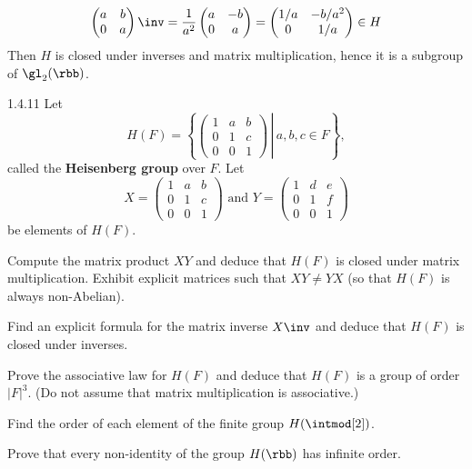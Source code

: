 \begin{solenum}
\[\begin{pmatrix}
            a & b \\
            0 & a
        \end{pmatrix}\inv = 
        \frac{1}{a^2}
        \begin{pmatrix}
            a & -b \\
            0 & a 
        \end{pmatrix} = 
        \begin{pmatrix}
            1/a & -b/a^2 \\
            0 & 1/a
        \end{pmatrix} \in H
    \]
    Then $H$ is closed under inverses and matrix multiplication, hence it is a subgroup of $\gl_2(\rbb)$.
\end{solenum}

\begin{exercise}{1.4.11}
    Let
    \[
        H(F) = \left\{\left.
        \begin{pmatrix}
            1 & a & b \\
            0 & 1 & c \\
            0 & 0 & 1
        \end{pmatrix}\,\right|\, a, b, c \in F\right\},
    \]
    called the \textbf{Heisenberg group} over $F$.
	Let
    \[
        X = 
        \begin{pmatrix}
            1 & a & b \\
            0 & 1 & c \\
            0 & 0 & 1
        \end{pmatrix} \text{ and }Y = 
        \begin{pmatrix}
            1 & d & e \\
            0 & 1 & f \\
            0 & 0 & 1
        \end{pmatrix}
    \]
    be elements of $H(F)$.
    \begin{subexercises}
        \item Compute the matrix product $XY$ and deduce that $H(F)$ is closed under matrix multiplication.
	    Exhibit explicit matrices such that $XY \neq YX$ (so that $H(F)$ is always non-Abelian).
        \item Find an explicit formula for the matrix inverse $X\inv$ and deduce that $H(F)$ is closed under inverses.
        \item Prove the associative law for $H(F)$ and deduce that $H(F)$ is a group of order $|F|^3$. (Do not assume that matrix multiplication is associative.)
        \item Find the order of each element of the finite group $H(\intmod[2])$.
        \item Prove that every non-identity of the group $H(\rbb)$ has infinite order.
    \end{subexercises}
\end{exercise}

